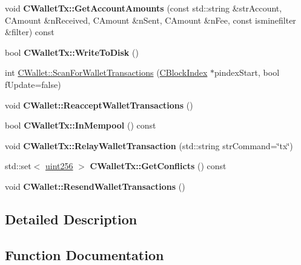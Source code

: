 \begin{DoxyCompactItemize}
\item 
\mbox{\label{group__map_wallet_gad74c232cc8983a1c032f2163751695ed}} 
void {\bfseries C\+Wallet\+Tx\+::\+Get\+Account\+Amounts} (const std\+::string \&str\+Account, C\+Amount \&n\+Received, C\+Amount \&n\+Sent, C\+Amount \&n\+Fee, const isminefilter \&filter) const
\item 
\mbox{\label{group__map_wallet_gada0e71d717dd360faf047de54eef4942}} 
bool {\bfseries C\+Wallet\+Tx\+::\+Write\+To\+Disk} ()
\item 
int \mbox{\hyperlink{group__map_wallet_ga979a17e80e4897ed1f4ae9a4be7c493c}{C\+Wallet\+::\+Scan\+For\+Wallet\+Transactions}} (\mbox{\hyperlink{class_c_block_index}{C\+Block\+Index}} $\ast$pindex\+Start, bool f\+Update=false)
\item 
\mbox{\label{group__map_wallet_ga796c23450c8482e10e0c75ae5c1fa8ed}} 
void {\bfseries C\+Wallet\+::\+Reaccept\+Wallet\+Transactions} ()
\item 
\mbox{\label{group__map_wallet_gae4af382e1eeba62ee7e84100c7234f23}} 
bool {\bfseries C\+Wallet\+Tx\+::\+In\+Mempool} () const
\item 
\mbox{\label{group__map_wallet_ga1eac2a5eea87ed88b73777bea5c733b6}} 
void {\bfseries C\+Wallet\+Tx\+::\+Relay\+Wallet\+Transaction} (std\+::string str\+Command=\char`\"{}tx\char`\"{})
\item 
\mbox{\label{group__map_wallet_ga127b064ab044a96158117ec8162188a7}} 
std\+::set$<$ \mbox{\hyperlink{classuint256}{uint256}} $>$ {\bfseries C\+Wallet\+Tx\+::\+Get\+Conflicts} () const
\item 
\mbox{\label{group__map_wallet_gaef8d6e5b4701ca3a64486c4232acc3fa}} 
void {\bfseries C\+Wallet\+::\+Resend\+Wallet\+Transactions} ()
\end{DoxyCompactItemize}


\subsection{Detailed Description}


\subsection{Function Documentation}
\mbox{\label{group__map_wallet_ga487f7cba517d37d24e5fa422711574d9}} 
